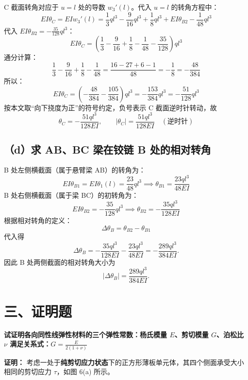 \documentclass[11pt,a4paper]{ctexrep}
\begin{document}
{C 截面转角对应于 $u=l$ 处的导数 $w_3'(l)$。代入 $u=l$ 的转角方程中：
\[
    EI \theta_C = EI w_3'(l) = \frac{1}{3} q l^3 - \frac{9}{16} ql^3 + \frac{1}{8} ql^3 + EI \theta_{B2} - \frac{1}{48} ql^3
\]
代入 $EI \theta_{B2} = -\frac{35}{128} ql^3$：
\[
    EI \theta_C = \left( \frac{1}{3} - \frac{9}{16} + \frac{1}{8} - \frac{1}{48} - \frac{35}{128} \right) ql^3
\]
通分计算：
\[
    \frac{1}{3} - \frac{9}{16} + \frac{1}{8} - \frac{1}{48}
    = \frac{16 - 27 + 6 - 1}{48}
    = -\frac{1}{8}
    = -\frac{48}{384}
\]
所以：
\[
    EI \theta_C = \left( -\frac{48}{384} - \frac{105}{384} \right) ql^3 = -\frac{153}{384} ql^3 = -\frac{51}{128} ql^3
\]
按本文取“向下挠度为正”的符号约定，负号表示 C 截面逆时针转动，故
\[
    \theta_C = -\frac{51ql^3}{128EI},\qquad |\theta_C|=\frac{51ql^3}{128EI}\quad (\text{逆时针})
\]

\subsection*{（d）求 AB、BC 梁在铰链 B 处的相对转角}

B 处左侧横截面（属于悬臂梁 AB）的转角为：
\[
    EI \theta_{B1} = EI \theta_1(l) = \frac{23}{48} ql^3 \implies \theta_{B1} = \frac{23ql^3}{48EI}
\]
B 处右侧横截面（属于梁 BC）的初转角为：
\[
    EI \theta_{B2} = -\frac{35}{128} ql^3 \implies \theta_{B2} = -\frac{35ql^3}{128EI}
\]
根据相对转角的定义：
\[
    \Delta \theta_B = \theta_{B2} - \theta_{B1}
\]
代入得
\[
    \Delta\theta_B
    =
    -\frac{35ql^3}{128EI}
    -
    \frac{23ql^3}{48EI}
    =
    -\frac{289ql^3}{384EI}.
\]
因此 B 处两侧截面的相对转角大小为
\[
    |\Delta\theta_B|=\frac{289ql^3}{384EI}.
\]




\section*{三、证明题}

\textbf{试证明各向同性线弹性材料的三个弹性常数：杨氏模量 $E$、剪切模量 $G$、泊松比 $\nu$ 满足关系式：$G = \frac{E}{2(1 + \nu)}$}

\textbf{证明：}
考虑一处于\textbf{纯剪切应力状态}下的正方形薄板单元体，其四个侧面承受大小相同的剪切应力 $\tau$，如图 6(a) 所示。

\begin{figure}[H]
\centering
{}
\end{figure}}
\end{document}

